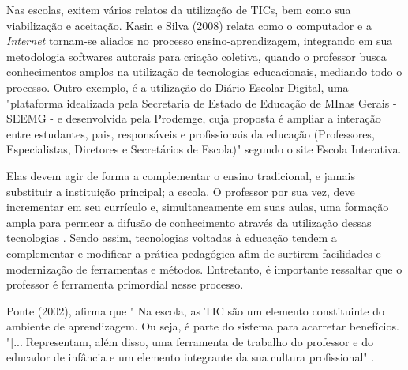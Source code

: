 Nas escolas, exitem vários relatos da utilização de TICs, bem como sua viabilização e aceitação. Kasin e Silva (2008) relata como o computador e a \textit{Internet} tornam-se aliados no processo ensino-aprendizagem, integrando em sua metodologia softwares autorais para criação coletiva, quando o professor busca conhecimentos amplos na utilização de tecnologias educacionais, mediando todo o processo. Outro exemplo, é a utilização do Diário Escolar Digital, uma "plataforma idealizada pela Secretaria de Estado de Educação de MInas Gerais - SEEMG - e desenvolvida pela Prodemge, cuja proposta é ampliar a interação entre estudantes, pais, responsáveis e profissionais da educação (Professores, Especialistas, Diretores e Secretários de Escola)" segundo o site Escola Interativa.
 

Elas devem agir de forma a complementar o ensino tradicional, e jamais substituir a instituição principal; a escola. O professor por sua vez, deve incrementar em seu currículo e, simultaneamente em suas aulas, uma formação ampla para permear a difusão de conhecimento através da utilização dessas tecnologias  \cite{albino2016avaliaccao}. Sendo assim, tecnologias voltadas à educação tendem a complementar e modificar a prática pedagógica afim de surtirem  facilidades e modernização de ferramentas e métodos. Entretanto, é importante ressaltar que o professor é ferramenta primordial nesse processo.


Ponte (2002), afirma que " Na escola, as TIC são um elemento constituinte do ambiente de aprendizagem. Ou seja, é parte do sistema para acarretar benefícios. "[...]Representam, além disso, uma ferramenta de trabalho do professor e do educador de infância e um elemento integrante da sua cultura
profissional" \cite[p. 2]{ponte2002tic}. 


